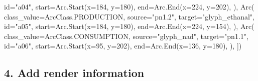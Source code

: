 \documentclass[
  letterpaper,
  DIV=11,
  numbers=noendperiod]{scrartcl}
\newenvironment{Shaded}{\begin{snugshade}}{\end{snugshade}}
\newcommand{\BuiltInTok}[1]{\textcolor[rgb]{0.00,0.23,0.31}{#1}}
\newcommand{\DecValTok}[1]{\textcolor[rgb]{0.68,0.00,0.00}{#1}}
\newcommand{\NormalTok}[1]{\textcolor[rgb]{0.00,0.23,0.31}{#1}}
\newcommand{\OperatorTok}[1]{\textcolor[rgb]{0.37,0.37,0.37}{#1}}
\newcommand{\StringTok}[1]{\textcolor[rgb]{0.13,0.47,0.30}{#1}}
\begin{document}
\begin{Shaded}
\begin{Highlighting}[]
        \BuiltInTok{id}\OperatorTok{=}\StringTok{"a04"}\NormalTok{,}
\NormalTok{        start}\OperatorTok{=}\NormalTok{Arc.Start(x}\OperatorTok{=}\DecValTok{184}\NormalTok{, y}\OperatorTok{=}\DecValTok{180}\NormalTok{),}
\NormalTok{        end}\OperatorTok{=}\NormalTok{Arc.End(x}\OperatorTok{=}\DecValTok{224}\NormalTok{, y}\OperatorTok{=}\DecValTok{202}\NormalTok{),}
\NormalTok{    ),}
\NormalTok{    Arc(}
\NormalTok{        class\_value}\OperatorTok{=}\NormalTok{ArcClass.PRODUCTION,}
\NormalTok{        source}\OperatorTok{=}\StringTok{"pn1.2"}\NormalTok{,}
\NormalTok{        target}\OperatorTok{=}\StringTok{"glyph\_ethanal"}\NormalTok{,}
        \BuiltInTok{id}\OperatorTok{=}\StringTok{"a05"}\NormalTok{,}
\NormalTok{        start}\OperatorTok{=}\NormalTok{Arc.Start(x}\OperatorTok{=}\DecValTok{184}\NormalTok{, y}\OperatorTok{=}\DecValTok{180}\NormalTok{),}
\NormalTok{        end}\OperatorTok{=}\NormalTok{Arc.End(x}\OperatorTok{=}\DecValTok{224}\NormalTok{, y}\OperatorTok{=}\DecValTok{154}\NormalTok{),}
\NormalTok{    ),}
\NormalTok{    Arc(}
\NormalTok{        class\_value}\OperatorTok{=}\NormalTok{ArcClass.CONSUMPTION,}
\NormalTok{        source}\OperatorTok{=}\StringTok{"glyph\_nad"}\NormalTok{,}
\NormalTok{        target}\OperatorTok{=}\StringTok{"pn1.1"}\NormalTok{,}
        \BuiltInTok{id}\OperatorTok{=}\StringTok{"a06"}\NormalTok{,}
\NormalTok{        start}\OperatorTok{=}\NormalTok{Arc.Start(x}\OperatorTok{=}\DecValTok{95}\NormalTok{, y}\OperatorTok{=}\DecValTok{202}\NormalTok{),}
\NormalTok{        end}\OperatorTok{=}\NormalTok{Arc.End(x}\OperatorTok{=}\DecValTok{136}\NormalTok{, y}\OperatorTok{=}\DecValTok{180}\NormalTok{),}
\NormalTok{    ),}
\NormalTok{])}
\end{Highlighting}
\end{Shaded}

\subsection{4. Add render information}\label{add-render-information}
\end{document}
